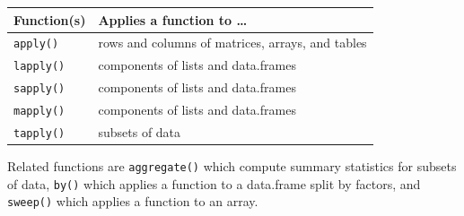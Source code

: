 \documentclass[12pt,a4paper]{book}
\theoremstyle{definition}
\theoremstyle{definition}
\theoremstyle{definition}
\theoremstyle{remark}
\begin{document}
\begin{longtable}[]{@{}ll@{}}
\toprule
\begin{minipage}[b]{0.27\columnwidth}\raggedright
\textbf{Function(s)}\strut
\end{minipage} & \begin{minipage}[b]{0.67\columnwidth}\raggedright
\textbf{Applies a function to \ldots{}}\strut
\end{minipage}\tabularnewline
\midrule
\endhead
\begin{minipage}[t]{0.27\columnwidth}\raggedright
\texttt{apply()}\strut
\end{minipage} & \begin{minipage}[t]{0.67\columnwidth}\raggedright
rows and columns of matrices, arrays, and tables\strut
\end{minipage}\tabularnewline
\begin{minipage}[t]{0.27\columnwidth}\raggedright
\texttt{lapply()}\strut
\end{minipage} & \begin{minipage}[t]{0.67\columnwidth}\raggedright
components of lists and data.frames\strut
\end{minipage}\tabularnewline
\begin{minipage}[t]{0.27\columnwidth}\raggedright
\texttt{sapply()}\strut
\end{minipage} & \begin{minipage}[t]{0.67\columnwidth}\raggedright
components of lists and data.frames\strut
\end{minipage}\tabularnewline
\begin{minipage}[t]{0.27\columnwidth}\raggedright
\texttt{mapply()}\strut
\end{minipage} & \begin{minipage}[t]{0.67\columnwidth}\raggedright
components of lists and data.frames\strut
\end{minipage}\tabularnewline
\begin{minipage}[t]{0.27\columnwidth}\raggedright
\texttt{tapply()}\strut
\end{minipage} & \begin{minipage}[t]{0.67\columnwidth}\raggedright
subsets of data\strut
\end{minipage}\tabularnewline
\bottomrule
\end{longtable}

Related functions are \texttt{aggregate()} which compute summary
statistics for subsets of data, \texttt{by()} which applies a function
to a data.frame split by factors, and \texttt{sweep()} which applies a
function to an array.
\end{document}
